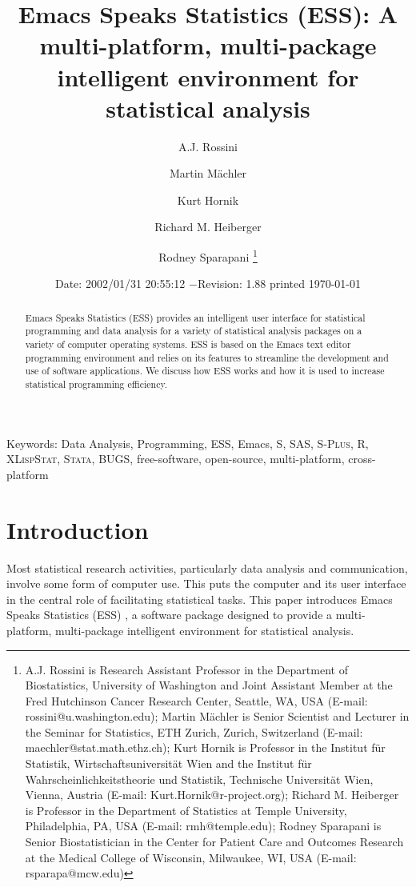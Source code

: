 \documentclass{article}
\title{Emacs Speaks Statistics (ESS): A multi-platform, multi-package
intelligent environment for statistical analysis}
\author{A.J. Rossini \and Martin M{\"a}chler \and Kurt Hornik \and Richard
  M. Heiberger \and Rodney Sparapani \footnote{%
    A.J. Rossini is Research Assistant Professor in the Department of
    Biostatistics, University of Washington and Joint Assistant Member at
    the Fred Hutchinson Cancer Research Center, Seattle, WA, USA
    (E-mail: rossini@u.washington.edu);
    Martin M{\"a}chler is Senior Scientist and Lecturer in the Seminar for
    Statistics, ETH Zurich, Zurich, Switzerland
    (E-mail: maechler@stat.math.ethz.ch);
    Kurt Hornik is Professor in the Institut f{\"u}r Statistik,
    Wirtschaftsuniversit{\"a}t Wien and the Institut f{\"u}r
    Wahrscheinlichkeitstheorie und Statistik, Technische Universit{\"a}t
    Wien, Vienna, Austria (E-mail: Kurt.Hornik@r-project.org);
    Richard M. Heiberger is Professor in the Department of Statistics at
    Temple University, Philadelphia, PA, USA (E-mail: rmh@temple.edu);
    Rodney Sparapani is Senior Biostatistician in the Center for Patient
    Care and Outcomes Research at the Medical College of Wisconsin, 
    Milwaukee, WI, USA (E-mail: rsparapa@mcw.edu)}}
\date{$ $Date: 2002/01/31 20:55:12 $ - $Revision: 1.88 $ $\tiny printed \today}
\newif\ifdraft
\renewcommand{\baselinestretch}{1.5}
\newcommand*{\SAS}{\textsc{SAS}}
\newcommand*{\Splus}{\textsc{S-Plus}}
\newcommand*{\XLispStat}{\textsc{XLispStat}}
\newcommand*{\Stata}{\textsc{Stata}}
\begin{document}
\ifdraft
\setcounter{page}{0}
\tableofcontents
\fi

\maketitle

\ifdraft{}%
\else%
 \renewcommand{\baselinestretch}{1.5}
\fi

\begin{abstract}
  Emacs Speaks Statistics (ESS) provides an intelligent user
  interface for statistical programming and data analysis 
  for a variety of statistical analysis packages on a
  variety of computer operating systems.  ESS is based on the Emacs
  text editor programming environment and relies 
  on its features to streamline the development and use of
  software applications.  We discuss how ESS works and how
  it is used to increase statistical programming efficiency.
\end{abstract}

\noindent Keywords: Data Analysis, Programming, ESS, Emacs, S, \SAS,
\Splus, R, \XLispStat, \Stata, BUGS, free-software, open-source,
multi-platform, cross-platform


\section{Introduction}
\label{sec:introduction}

Most statistical research activities, particularly data analysis and
communication, involve some form of computer use.
This puts the computer and its user interface
in the central role of facilitating statistical tasks.
This paper introduces Emacs Speaks Statistics (ESS)
\citep{ESS}, a software package designed to provide a 
multi-platform, multi-package intelligent environment for statistical analysis.
\end{document}
